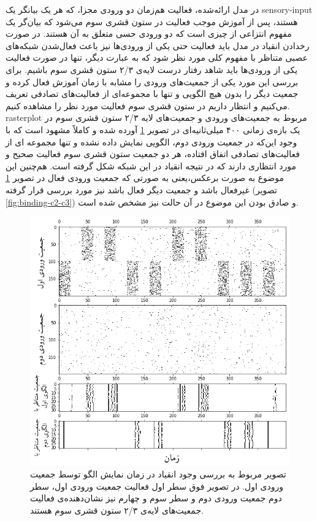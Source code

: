 \documentclass[12pt]{report}
\begin{document}
	در مدل ارائه‌شده، فعالیت هم‌زمان دو ورودی مجزا، که هر یک بیانگر یک \gls{sensory-input} هستند،  پس از آموزش موجب فعالیت در ستون قشری سوم می‌شود که بیان‌گر یک مفهوم انتزاعی از چیزی است که دو ورودی حسی متعلق به آن هستند. در صورت رخدادن انقیاد در مدل باید فعالیت حتی یکی از ورودی‌ها نیز باعث فعال‌شدن شبکه‌های عصبی متناظر با مفهوم کلی مورد نظر شود که به عبارت دیگر، تنها در صورت فعالیت یکی از ورودی‌ها باید شاهد رفتار درست لایه‌ی ۲/۳ ستون قشری سوم باشیم.
	برای بررسی این مورد یکی از جمعیت‌های ورودی را مشابه با زمان آموزش فعال کرده و جمعیت دیگر را بدون هیچ الگویی و تنها با مجموعه‌ای از فعالیت‌های تصادفی تعریف می‌کنیم و انتظار داریم در ستون قشری سوم فعالیت مورد نظر را مشاهده کنیم. \gls{rasterplot} مربوط به جمعیت‌های ورودی و جمعیت‌های لایه ۲/۳ ستون قشری سوم در یک بازه‌ی زمانی ۴۰۰ میلی‌ثانیه‌ای در تصویر \ref{fig:binding-c1-c3} آورده شده‌ و کاملاً مشهود است که با وجود این‌که در جمعیت ورودی دوم، الگویی نمایش داده نشده و تنها مجموعه ای از فعالیت‌های تصادفی اتفاق افتاده، هر دو جمعیت ستون قشری سوم فعالیت صحیح و مورد انتظاری دارند که در نتیجه انقیاد در این شبکه شکل گرفته است. هم‌چنین این موضوع به صورت برعکس،یعنی به صورتی که جمعیت ورودی فعال در تصویر \ref{fig:binding-c1-c3} غیر‌فعال باشد و جمعیت دیگر فعال باشد نیز مورد بررسی قرار گرفته (تصویر \ref{fig:binding-c2-c3}) و صادق بودن این موضوع در آن حالت نیز مشخص شده‌ است.
	
	\begin{figure}[]
		\centering
		\includegraphics[width=1.0\linewidth]{binding-c1-c3.png}
		\caption[NS]{
			تصویر مربوط به بررسی وجود انقیاد در زمان نمایش الگو توسط جمعیت ورودی اول. در تصویر فوق سطر اول فعالیت جمعیت ورودی اول، سطر دوم جمعیت ورودی دوم و سطر سوم و چهارم نیز نشان‌دهنده‌ی فعالیت جمعیت‌های لایه‌ی ۲/۳ ستون قشری سوم هستند.
		}
		\label{fig:binding-c1-c3} 
	\end{figure}
\end{document}

